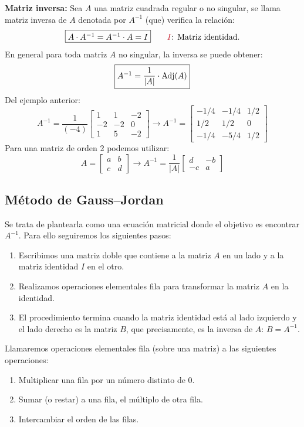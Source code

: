 \documentclass[11pt,a4paper]{article}
\newcommand{\hl}[1]{\textcolor{resaltado}{#1}}
\begin{document}
\textbf{Matriz inversa:} Sea $A$ una matriz cuadrada regular o no singular, se llama matriz
inversa de $A$ denotada por $A^{-1}$ (que) verifica la relación:
\[\fbox{$A\cdot A^{-1} = A^{-1}\cdot A = I$} \qquad \textcolor{rojo}{I}\text{: Matriz identidad.}\]
En general para toda matriz $A$ no singular, la inversa se puede obtener:
\[\fbox{$A^{-1} = \dfrac{1}{|A|}\cdot\operatorname{Adj}(A)$}\]
Del ejemplo anterior:
\[
A^{-1} = \frac{1}{(-4)}\begin{bmatrix} 1 & 1 & -2\\ -2 & -2 & 0\\ 1 & 5 & -2\end{bmatrix}
\longrightarrow
A^{-1} = \begin{bmatrix} -1/4 & -1/4 & 1/2\\ 1/2 & 1/2 & 0\\ -1/4 & -5/4 & 1/2\end{bmatrix}
\]
Para una matriz de \hl{orden 2} podemos utilizar:
\[
A = \begin{bmatrix} a & b\\ c & d\end{bmatrix}
\longrightarrow
A^{-1} = \frac{1}{|A|}\begin{bmatrix} d & -b\\ -c & a\end{bmatrix}
\]


\subsection*{Método de Gauss--Jordan}
Se trata de plantearla como una ecuación matricial donde el objetivo es encontrar
$A^{-1}$. Para ello seguiremos los siguientes pasos:
\begin{enumerate}
  \item Escribimos una matriz doble que contiene a la matriz $A$ en un lado y a la matriz
  identidad $I$ en el otro.
  \item Realizamos \hl{operaciones elementales fila} para transformar la matriz $A$ en la
  identidad.
  \item El procedimiento termina cuando la matriz identidad está al lado izquierdo y el
  lado derecho es la matriz $B$, que precisamente, es la inversa de $A$: $B = A^{-1}$.
\end{enumerate}

Llamaremos operaciones elementales fila (sobre una matriz) a las siguientes operaciones:
\begin{enumerate}
  \item Multiplicar una fila por un número distinto de $0$.
  \item Sumar (o restar) a una fila, el múltiplo de otra fila.
  \item Intercambiar el orden de las filas.
\end{enumerate}
\end{document}
